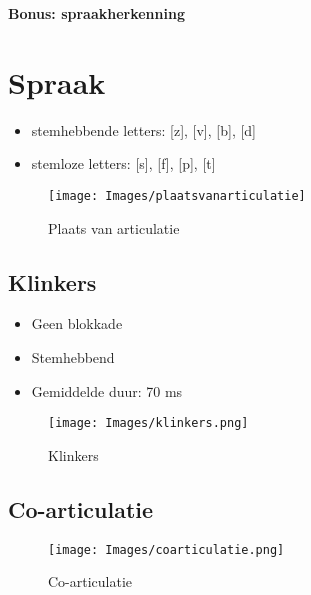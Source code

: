 {\large
\textbf{{\LARGE Bonus: spraakherkenning}}
\section{Spraak}
\begin{itemize}
    \item stemhebbende letters: [z], [v], [b], [d]
    \item stemloze letters: [s], [f], [p], [t]
\end{itemize}

\begin{figure}[h]
    \centering
    \texttt{[image: Images/plaatsvanarticulatie]}
    \caption{Plaats van articulatie}
    \label{fig:articulatie}
\end{figure}

\subsection{Klinkers}
\begin{itemize}
    \item Geen blokkade
    \item Stemhebbend
    \item Gemiddelde duur: 70 ms
\end{itemize}

\begin{figure}[h]
    \centering
    \texttt{[image: Images/klinkers.png]}
    \caption{Klinkers}
    \label{fig:articulatie}
\end{figure}

\subsection{Co-articulatie}

\begin{figure}[h!]
    \centering
    \texttt{[image: Images/coarticulatie.png]}
    \caption{Co-articulatie}
    \label{fig:articulatie}
\end{figure}

}
